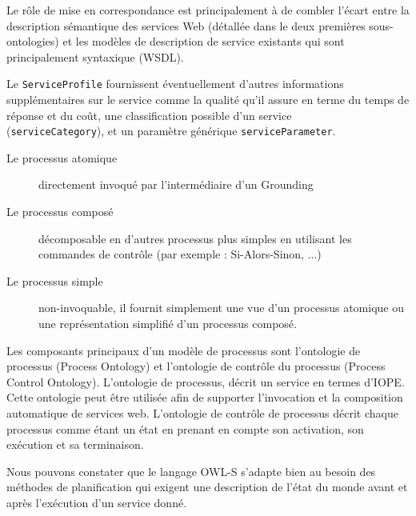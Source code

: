 \begin{description}
      Le rôle de mise en correspondance est principalement à de
      combler l'écart entre la description sémantique des services Web
      (détallée dans le deux premières sous-ontologies) et les
      modèles de description de service existants qui sont
      principalement syntaxique (\textsc{WSDL}).
    \end{description}

    Le \verb|ServiceProfile| fournissent éventuellement d'autres
    informations supplémentaires sur le service comme la qualité
    qu'il assure en terme du temps de réponse et du coût, une
    classification possible d'un service \\(\verb|serviceCategory|),
    et un paramètre générique \verb|serviceParameter|.
    \\
    {\color{red}

      \SpecialItemi
      \begin{description}
      \item[Le processus atomique] directement invoqué par
        l’intermédiaire d’un Grounding
      \item[Le processus composé] décomposable en d’autres processus
        plus simples en utilisant les commandes de contrôle (par
        exemple : Si-Alors-Sinon, ...)

      \item[Le processus simple] non-invoquable, il fournit simplement
        une vue d’un processus atomique ou une représentation
        simplifié d’un processus composé.
      \end{description}

      Les composants principaux d’un modèle de processus sont
      l’ontologie de processus (Process Ontology) et l’ontologie de
      contrôle du processus (Process Control Ontology).  L’ontologie
      de processus, décrit un service en termes d’IOPE. Cette
      ontologie peut être utilisée afin de supporter l’invocation et
      la composition automatique de services web.  L’ontologie de
      contrôle de processus décrit chaque processus comme étant un
      état en prenant en compte son activation, son exécution et sa
      terminaison.

      Nous pouvons constater que le langage OWL-S s'adapte bien au
      besoin des méthodes de planification qui exigent une description
      de l’état du monde avant et après l’exécution d’un service donné.

}
